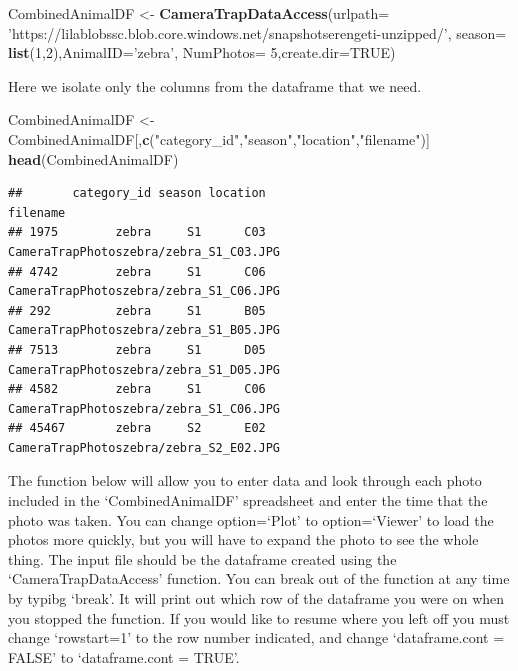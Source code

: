 \documentclass[]{book}
\newenvironment{Shaded}{\begin{snugshade}}{\end{snugshade}}
\newcommand{\DataTypeTok}[1]{\textcolor[rgb]{0.13,0.29,0.53}{#1}}
\newcommand{\DecValTok}[1]{\textcolor[rgb]{0.00,0.00,0.81}{#1}}
\newcommand{\KeywordTok}[1]{\textcolor[rgb]{0.13,0.29,0.53}{\textbf{#1}}}
\newcommand{\NormalTok}[1]{#1}
\newcommand{\OtherTok}[1]{\textcolor[rgb]{0.56,0.35,0.01}{#1}}
\newcommand{\StringTok}[1]{\textcolor[rgb]{0.31,0.60,0.02}{#1}}
\begin{document}
\begin{Shaded}
\begin{Highlighting}[]
\NormalTok{CombinedAnimalDF <-}\StringTok{ }\KeywordTok{CameraTrapDataAccess}\NormalTok{(}\DataTypeTok{urlpath=} \StringTok{'https://lilablobssc.blob.core.windows.net/snapshotserengeti-unzipped/'}\NormalTok{,}
                     \DataTypeTok{season=} \KeywordTok{list}\NormalTok{(}\DecValTok{1}\NormalTok{,}\DecValTok{2}\NormalTok{),}\DataTypeTok{AnimalID=}\StringTok{'zebra'}\NormalTok{, }\DataTypeTok{NumPhotos=} \DecValTok{5}\NormalTok{,}\DataTypeTok{create.dir=}\OtherTok{TRUE}\NormalTok{)}
\end{Highlighting}
\end{Shaded}

Here we isolate only the columns from the dataframe that we need.

\begin{Shaded}
\begin{Highlighting}[]
\NormalTok{CombinedAnimalDF <-}\StringTok{ }\NormalTok{CombinedAnimalDF[,}\KeywordTok{c}\NormalTok{(}\StringTok{"category_id"}\NormalTok{,}\StringTok{"season"}\NormalTok{,}\StringTok{"location"}\NormalTok{,}\StringTok{"filename"}\NormalTok{)]}
\KeywordTok{head}\NormalTok{(CombinedAnimalDF)}
\end{Highlighting}
\end{Shaded}

\begin{verbatim}
##       category_id season location                               filename
## 1975        zebra     S1      C03 CameraTrapPhotoszebra/zebra_S1_C03.JPG
## 4742        zebra     S1      C06 CameraTrapPhotoszebra/zebra_S1_C06.JPG
## 292         zebra     S1      B05 CameraTrapPhotoszebra/zebra_S1_B05.JPG
## 7513        zebra     S1      D05 CameraTrapPhotoszebra/zebra_S1_D05.JPG
## 4582        zebra     S1      C06 CameraTrapPhotoszebra/zebra_S1_C06.JPG
## 45467       zebra     S2      E02 CameraTrapPhotoszebra/zebra_S2_E02.JPG
\end{verbatim}

The function below will allow you to enter data and look through each photo included in the `CombinedAnimalDF' spreadsheet and enter the time that the photo was taken. You can change option=`Plot' to option=`Viewer' to load the photos more quickly, but you will have to expand the photo to see the whole thing. The input file should be the dataframe created using the `CameraTrapDataAccess' function. You can break out of the function at any time by typibg `break'. It will print out which row of the dataframe you were on when you stopped the function. If you would like to resume where you left off you must change `rowstart=1' to the row number indicated, and change `dataframe.cont = FALSE' to `dataframe.cont = TRUE'.
\end{document}
